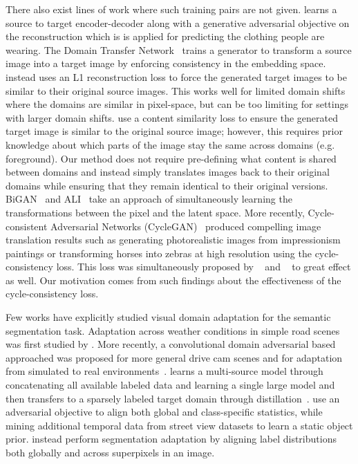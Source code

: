 There also exist lines of work where such training pairs are not given.
\citet{yoo_eccv16} learns a source to target encoder-decoder along with a generative adversarial objective on the reconstruction which is is applied for predicting the clothing people are wearing.
The Domain Transfer Network~\citep{taigman_iclr17} trains a generator to transform a source image into a target image by enforcing consistency in the embedding space.
\citet{shrivastava_cvpr17} instead uses an L1 reconstruction loss to force the generated target images to be similar to their original source images.%
This works well for limited domain shifts where the domains are similar in pixel-space, but can be too limiting for settings with larger domain shifts.
\citet{bousmalis_cvpr17} use a content similarity loss to ensure the generated target image is similar to the original source image; however, this requires prior knowledge about which parts of the image stay the same across domains (e.g. foreground).
Our method does not require pre-defining what content is shared between domains and instead simply translates images back to their original domains while ensuring that they remain identical to their original versions.
BiGAN~\citep{donahue2016adversarial} and ALI~\citep{dumoulin2016adversarially} take an approach of simultaneously learning the transformations between the pixel and the latent space.
More recently, Cycle-consistent Adversarial Networks (CycleGAN)~\citep{zhu_arxiv17} produced compelling image translation results such as generating photorealistic images from impressionism paintings or transforming horses into zebras at high resolution using the cycle-consistency loss.
This loss was simultaneously proposed by ~\cite{yi2017dualgan} and ~\cite{kim_arxiv17} to great effect as well.
Our motivation comes from such findings about the effectiveness of the cycle-consistency loss. %


Few works have explicitly studied visual domain adaptation for the semantic segmentation task. Adaptation across weather conditions in simple road scenes was first studied by \citet{levinkov_iccv13}. More recently, a convolutional domain adversarial based approached was proposed for more general drive cam scenes and for adaptation from simulated to real environments~\citep{hoffman_arxiv16}.
\citet{ros_arxiv16} learns a multi-source model through concatenating all available labeled data and learning a single large model and then transfers to a sparsely labeled target domain through distillation~\citep{hinton_arxiv15}.
\citet{chen_iccv17} use an adversarial objective to align both global and class-specific statistics, while mining additional temporal data from street view datasets to learn a static object prior.
\citet{zhang_iccv17} instead perform segmentation adaptation by aligning label distributions both globally and across superpixels in an image.


